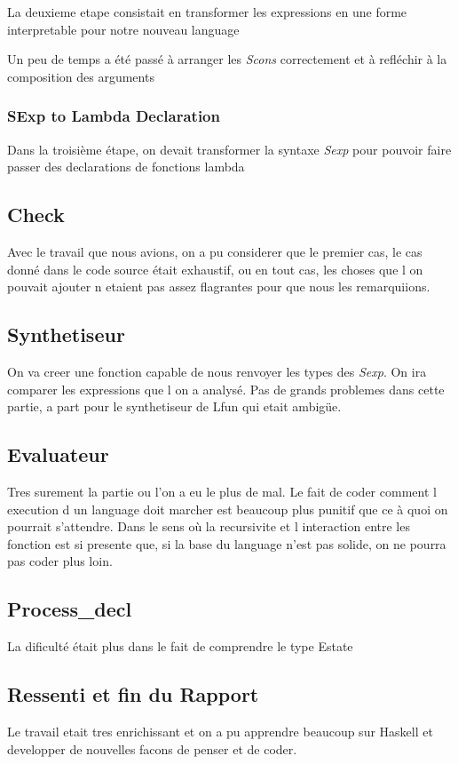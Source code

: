 \documentclass{article}
\begin{document}
La deuxieme etape consistait en transformer les expressions en une forme interpretable pour notre nouveau language

Un peu de temps a été passé à arranger les {\slshape Scons} correctement et à refléchir à la composition des arguments


\subsubsection{ SExp to Lambda Declaration} 

Dans la troisième étape, on devait transformer la syntaxe {\slshape Sexp} pour pouvoir faire passer des declarations de fonctions lambda

\subsection{ Check }
Avec le travail que nous avions, on a pu considerer que le premier cas, le cas donné dans le code source était exhaustif, ou en tout cas, les choses que l on pouvait ajouter n etaient pas assez flagrantes pour que nous les remarquiions.

\subsection{ Synthetiseur }

On va creer une fonction capable de nous renvoyer les types des {\slshape Sexp}. On ira comparer les expressions que l on a analysé.
Pas de grands problemes dans cette partie, a part pour le synthetiseur de Lfun qui etait ambigüe.


\subsection {Evaluateur }
Tres surement la partie ou l'on a eu le plus de mal. Le fait de coder comment l execution d un language doit marcher est beaucoup plus punitif que ce à quoi on pourrait s'attendre. Dans le sens où la recursivite et l interaction entre les fonction est si presente que, si la base du language n'est pas solide, on ne pourra pas coder plus loin.

\subsection{ Process_decl }

La dificulté était plus dans le fait de comprendre le type Estate

\subsection{ Ressenti et fin du Rapport }

Le travail etait tres enrichissant et on a pu apprendre beaucoup sur Haskell et developper de nouvelles facons de penser et de coder.
\end{document}
